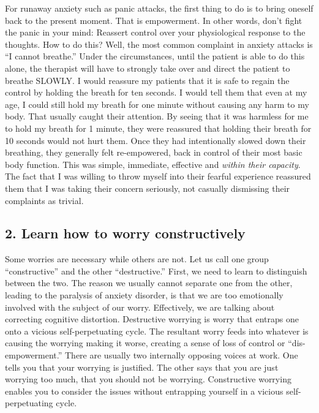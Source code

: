 \documentclass[]{book}
\begin{document}
For runaway anxiety such as panic attacks, the first thing to do is to bring oneself back to the present moment. That is empowerment. In other words, don't fight the panic in your mind: Reassert control over your physiological response to the thoughts. How to do this? Well, the most common complaint in anxiety attacks is ``I cannot breathe.'' Under the circumstances, until the patient is able to do this alone, the therapist will have to strongly take over and direct the patient to breathe SLOWLY. I would reassure my patients that it is safe to regain the control by holding the breath for ten seconds. I would tell them that even at my age, I could still hold my breath for one minute without causing any harm to my body. That usually caught their attention. By seeing that it was harmless for me to hold my breath for 1 minute, they were reassured that holding their breath for 10 seconds would not hurt them. Once they had intentionally slowed down their breathing, they generally felt re-empowered, back in control of their most basic body function. This was simple, immediate, effective and \emph{within their capacity}. The fact that I was willing to throw myself into their fearful experience reassured them that I was taking their concern seriously, not casually dismissing their complaints as trivial.

\hypertarget{learn-how-to-worry-constructively}{%
\subsection*{2. Learn how to worry constructively}\label{learn-how-to-worry-constructively}}

Some worries are necessary while others are not. Let us call one group ``constructive'' and the other ``destructive.'' First, we need to learn to distinguish between the two. The reason we usually cannot separate one from the other, leading to the paralysis of anxiety disorder, is that we are too emotionally involved with the subject of our worry. Effectively, we are talking about correcting cognitive distortion.
Destructive worrying is worry that entraps one onto a vicious self-perpetuating cycle. The resultant worry feeds into whatever is causing the worrying making it worse, creating a sense of loss of control or ``dis-empowerment.'' There are usually two internally opposing voices at work. One tells you that your worrying is justified. The other says that you are just worrying too much, that you should not be worrying. Constructive worrying enables you to consider the issues without entrapping yourself in a vicious self-perpetuating cycle.
\end{document}
